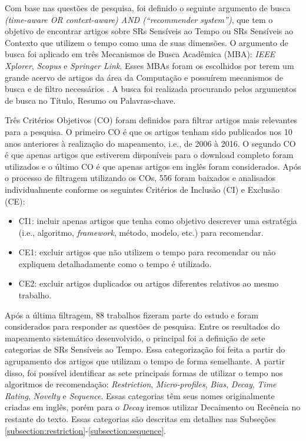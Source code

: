 Com base nas questões de pesquisa, foi definido o seguinte argumento de busca
\textit{(time-aware OR context-aware) AND (``recommender system'')}, que tem o objetivo de encontrar artigos sobre
SRs Sensíveis ao Tempo ou SRs Sensíveis ao Contexto que utilizem o tempo como uma de suas dimensões.
O argumento de busca foi aplicado em três Mecanismos de Busca Acadêmica (MBA): \textit{IEEE Xplorer}, \textit{Scopus} e
\textit{Springer Link}. Esses MBAs foram os escolhidos por terem um grande acervo
de artigos da área da Computação e possuírem mecanismos de busca e de filtro necessários \cite{de2017time}. A busca
foi realizada procurando pelos argumentos de busca no Título, Resumo ou Palavras-chave.

Três Critérios Objetivos (CO) foram definidos para filtrar artigos mais relevantes para a pesquisa. O primeiro CO é que os
artigos tenham sido publicados nos 10 anos anteriores à realização do mapeamento, i.e., de 2006 à 2016. O segundo CO é
que apenas artigos que estiverem disponíveis para o download completo foram utilizados e o último CO é que apenas artigos
em inglês foram considerados. Após o processo de filtragem utilizando os COs, 556 foram baixados e analisados individualmente
conforme os seguintes Critérios de Inclusão (CI) e Exclusão (CE):

\begin{itemize}
\item CI1: incluir apenas artigos que tenha como objetivo descrever uma estratégia (i.e., algoritmo, \textit{framework},
método, modelo, etc.) para recomendar.
\item CE1: excluir artigos que não utilizem o tempo para recomendar ou não expliquem detalhadamente como o tempo é utilizado.
\item CE2: excluir artigos duplicados ou artigos diferentes relativos ao mesmo trabalho.
\end{itemize}

Após a última filtragem, 88 trabalhos fizeram parte do estudo e foram considerados para responder as
questões de pesquisa. Entre os resultados do mapeamento sistemático desenvolvido, o principal
foi a definição de sete categorias de SRs Sensíveis ao Tempo. Essa categorização foi feita a partir do agrupamento
dos artigos que utilizam o tempo de forma semelhante. A partir disso, foi possível identificar as sete principais
formas de utilizar o tempo nos algoritmos de recomendação: \textit{Restriction}, \textit{Micro-profiles}, \textit{Bias},
\textit{Decay}, \textit{Time Rating}, \textit{Novelty} e \textit{Sequence}. Essas categorias têm seus nomes originalmente
criadas em inglês, porém para o \textit{Decay} iremos utilizar Decaimento ou Recência no restante do texto. Essas
categorias são descritas em detalhes nas Subseções \ref{subsection:restriction}-\ref{subsection:sequence}.

